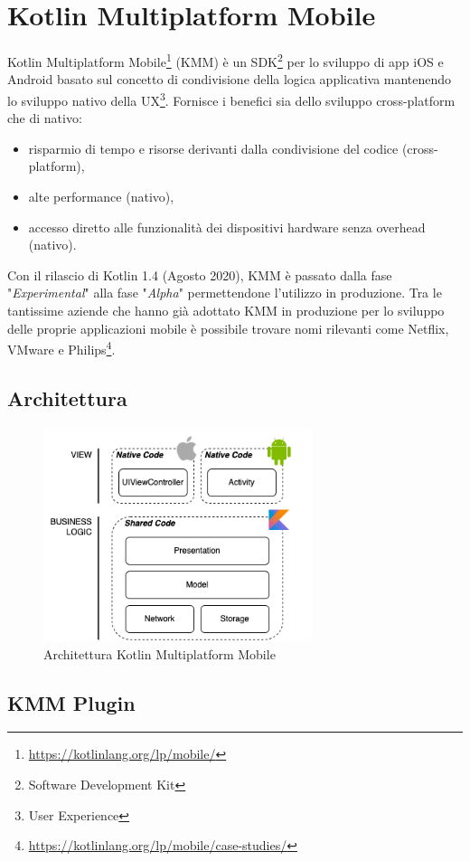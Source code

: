 
\section{Kotlin Multiplatform Mobile}
Kotlin Multiplatform Mobile\footnote{\url{https://kotlinlang.org/lp/mobile/}} (KMM) è un SDK\footnote{Software Development Kit} per lo sviluppo di app iOS e Android basato sul concetto di condivisione della logica applicativa mantenendo lo sviluppo nativo della UX\footnote{User Experience}. Fornisce i benefici sia dello sviluppo cross-platform che di nativo:
\begin{itemize}
    \item risparmio di tempo e risorse derivanti dalla condivisione del codice (cross-platform),
    \item alte performance (nativo),
    \item accesso diretto alle funzionalità dei dispositivi hardware senza overhead (nativo).
\end{itemize}
Con il rilascio di Kotlin 1.4 (Agosto 2020), KMM è passato dalla fase "\textit{Experimental}" alla fase "\textit{Alpha}" permettendone l'utilizzo in produzione. Tra le tantissime aziende che hanno già adottato KMM in produzione per lo sviluppo delle proprie applicazioni mobile è possibile trovare nomi rilevanti come Netflix, VMware e Philips\footnote{\url{https://kotlinlang.org/lp/mobile/case-studies/}}.

\subsection{Architettura}
\begin{figure}[H]
\centering
\includegraphics[width=0.7\textwidth]{img/tesi-8-kmm.drawio.png}
\caption{Architettura Kotlin Multiplatform Mobile}
\end{figure}

\subsection{KMM Plugin}